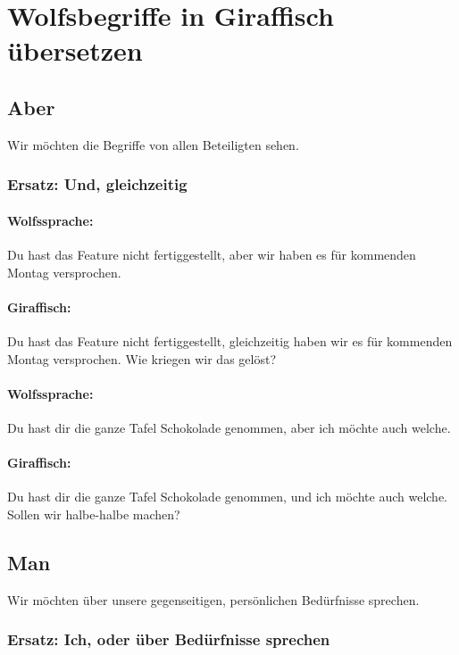 \section{Wolfsbegriffe in Giraffisch übersetzen}
\label{wolfsbegriffe-ersetzen}


\subsection{Aber}

Wir möchten die Begriffe von allen Beteiligten sehen.

\subsubsection{Ersatz: Und, gleichzeitig}

\paragraph{Wolfssprache:} Du hast das Feature nicht fertiggestellt, aber wir haben es für kommenden Montag versprochen.

\paragraph{Giraffisch:} Du hast das Feature nicht fertiggestellt, gleichzeitig haben wir es für kommenden Montag versprochen. Wie kriegen wir das gelöst?

\paragraph{Wolfssprache:} Du hast dir die ganze Tafel Schokolade genommen, aber ich möchte auch welche.

\paragraph{Giraffisch:} Du hast dir die ganze Tafel Schokolade genommen, und ich möchte auch welche. Sollen wir halbe-halbe machen?


\subsection{Man}

Wir möchten über unsere gegenseitigen, persönlichen Bedürfnisse sprechen.

\subsubsection{Ersatz: Ich, oder über Bedürfnisse sprechen}

